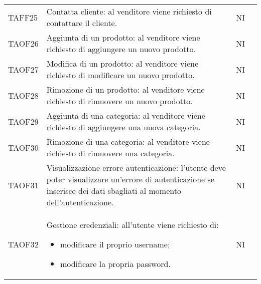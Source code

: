 \begin{center}
\begin{longtable}[!h]{p{50px} p{245px} p{75px} p{50px}}
        TAFF25                           & Contatta cliente: al venditore viene richiesto di contattare il cliente.                                                                                            & NI             \\
        TAOF26                           & Aggiunta di un prodotto: al venditore viene richiesto di aggiungere un nuovo prodotto.                                                                              & NI             \\
        TAOF27                           & Modifica di un prodotto: al venditore viene richiesto di modificare un nuovo prodotto.                                                                              & NI             \\
        TAOF28                           & Rimozione di un prodotto: al venditore viene richiesto di rimuovere un nuovo prodotto.                                                                              & NI             \\
        TAOF29                           & Aggiunta di una categoria: al venditore viene richiesto di aggiungere una nuova categoria.                                                                          & NI             \\
        TAOF30                           & Rimozione di una categoria: al venditore viene richiesto di rimuovere una categoria.                                                                                & NI             \\
        TAOF31                           & Visualizzazione errore autenticazione: l'utente deve poter visualizzare un'errore di autenticazione se inserisce dei dati sbagliati al momento dell'autenticazione. & NI             \\
        TAOF32                           & Gestione credenziali: all'utente viene richiesto di: \begin{itemize} \item modificare il proprio username; \item modificare la propria password.\end{itemize}                                                                                     & NI             \\
    \end{longtable}
\end{center}